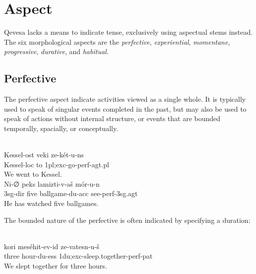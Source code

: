 \documentclass[grammar]{subfiles}
\begin{document}
\section{Aspect}
\label{sec:vm_aspect}

Qevesa lacks a means to indicate tense, exclusively using aspectual stems
instead.  The six morphological aspects are the \emph{perfective},
\emph{experiential}, \emph{momentane}, \emph{progressive}, \emph{durative}, and
\emph{habitual}.


\subsection{Perfective}
\label{vp:ssec_perfective}

The perfective aspect indicate activities viewed as a single whole.  It is
typically used to speak of singular events completed in the past, but may also
be used to speak of actions without internal structure, or events that are
bounded temporally, spacially, or conceptually. 

\begin{exe}
  \ex {}\\ %
  \gll Kessel-ost veki ze-két-u-ns\\
  Kessel-\acs{loc} to \acs{1pl};\acs{exc}-go-\acs{perf}-\acs{agt}.\acs{pl}\\
  \glt We went to Kessel.
  \ex {}\\
  \gll Ni-∅ peks lamizti-v-aš mór-u-n\\ 
  \acs{3sg}-\acs{dir} five ballgame-\acs{du}-\acs{acc} see-\acs{perf}-\acs{3sg}.\acs{agt}\\
  \glt He has watched five ballgames.
\end{exe}

The bounded nature of the perfective is often indicated by specifying a duration:

\begin{exe}
  \ex {}\\
  \gll kori meséhit-ev-id ze-vatesn-u-š\\
  three hour-\acs{du}-\acs{ess} \acs{1du};\acs{exc}-sleep.together-\acs{perf}-\acs{pat}\\
  \glt We slept together for three hours.
\end{exe}

\end{document}
